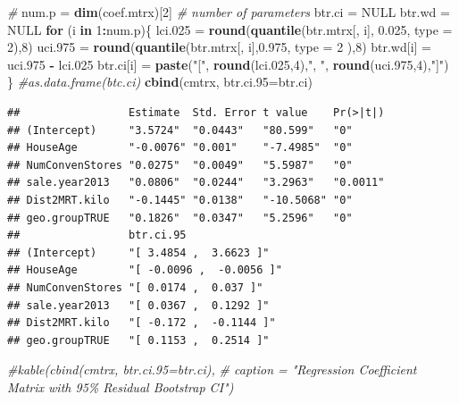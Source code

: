 \documentclass[
]{book}
\newenvironment{Shaded}{\begin{snugshade}}{\end{snugshade}}
\newcommand{\AttributeTok}[1]{\textcolor[rgb]{0.13,0.29,0.53}{#1}}
\newcommand{\CommentTok}[1]{\textcolor[rgb]{0.56,0.35,0.01}{\textit{#1}}}
\newcommand{\ConstantTok}[1]{\textcolor[rgb]{0.56,0.35,0.01}{#1}}
\newcommand{\ControlFlowTok}[1]{\textcolor[rgb]{0.13,0.29,0.53}{\textbf{#1}}}
\newcommand{\DecValTok}[1]{\textcolor[rgb]{0.00,0.00,0.81}{#1}}
\newcommand{\FloatTok}[1]{\textcolor[rgb]{0.00,0.00,0.81}{#1}}
\newcommand{\FunctionTok}[1]{\textcolor[rgb]{0.13,0.29,0.53}{\textbf{#1}}}
\newcommand{\NormalTok}[1]{#1}
\newcommand{\OtherTok}[1]{\textcolor[rgb]{0.56,0.35,0.01}{#1}}
\newcommand{\SpecialCharTok}[1]{\textcolor[rgb]{0.81,0.36,0.00}{\textbf{#1}}}
\newcommand{\StringTok}[1]{\textcolor[rgb]{0.31,0.60,0.02}{#1}}
\begin{document}
\begin{Shaded}
\begin{Highlighting}[]
\CommentTok{\#}
\NormalTok{num.p }\OtherTok{=} \FunctionTok{dim}\NormalTok{(coef.mtrx)[}\DecValTok{2}\NormalTok{]  }\CommentTok{\# number of parameters}
\NormalTok{btr.ci }\OtherTok{=} \ConstantTok{NULL}
\NormalTok{btr.wd }\OtherTok{=} \ConstantTok{NULL}
\ControlFlowTok{for}\NormalTok{ (i }\ControlFlowTok{in} \DecValTok{1}\SpecialCharTok{:}\NormalTok{num.p)\{}
\NormalTok{  lci}\FloatTok{.025} \OtherTok{=} \FunctionTok{round}\NormalTok{(}\FunctionTok{quantile}\NormalTok{(btr.mtrx[, i], }\FloatTok{0.025}\NormalTok{, }\AttributeTok{type =} \DecValTok{2}\NormalTok{),}\DecValTok{8}\NormalTok{)}
\NormalTok{  uci}\FloatTok{.975} \OtherTok{=} \FunctionTok{round}\NormalTok{(}\FunctionTok{quantile}\NormalTok{(btr.mtrx[, i],}\FloatTok{0.975}\NormalTok{, }\AttributeTok{type =} \DecValTok{2}\NormalTok{ ),}\DecValTok{8}\NormalTok{)}
\NormalTok{  btr.wd[i] }\OtherTok{=}\NormalTok{ uci}\FloatTok{.975} \SpecialCharTok{{-}}\NormalTok{ lci}\FloatTok{.025}
\NormalTok{  btr.ci[i] }\OtherTok{=} \FunctionTok{paste}\NormalTok{(}\StringTok{"["}\NormalTok{, }\FunctionTok{round}\NormalTok{(lci}\FloatTok{.025}\NormalTok{,}\DecValTok{4}\NormalTok{),}\StringTok{", "}\NormalTok{, }\FunctionTok{round}\NormalTok{(uci}\FloatTok{.975}\NormalTok{,}\DecValTok{4}\NormalTok{),}\StringTok{"]"}\NormalTok{)}
\NormalTok{\}}
\CommentTok{\#as.data.frame(btc.ci)}
\FunctionTok{cbind}\NormalTok{(cmtrx, }\AttributeTok{btr.ci.95=}\NormalTok{btr.ci)}
\end{Highlighting}
\end{Shaded}

\begin{verbatim}
##                 Estimate  Std. Error t value    Pr(>|t|)
## (Intercept)     "3.5724"  "0.0443"   "80.599"   "0"     
## HouseAge        "-0.0076" "0.001"    "-7.4985"  "0"     
## NumConvenStores "0.0275"  "0.0049"   "5.5987"   "0"     
## sale.year2013   "0.0806"  "0.0244"   "3.2963"   "0.0011"
## Dist2MRT.kilo   "-0.1445" "0.0138"   "-10.5068" "0"     
## geo.groupTRUE   "0.1826"  "0.0347"   "5.2596"   "0"     
##                 btr.ci.95               
## (Intercept)     "[ 3.4854 ,  3.6623 ]"  
## HouseAge        "[ -0.0096 ,  -0.0056 ]"
## NumConvenStores "[ 0.0174 ,  0.037 ]"   
## sale.year2013   "[ 0.0367 ,  0.1292 ]"  
## Dist2MRT.kilo   "[ -0.172 ,  -0.1144 ]" 
## geo.groupTRUE   "[ 0.1153 ,  0.2514 ]"
\end{verbatim}

\begin{Shaded}
\begin{Highlighting}[]
\CommentTok{\#kable(cbind(cmtrx, btr.ci.95=btr.ci), }
\CommentTok{\#      caption = "Regression Coefficient Matrix with 95\% Residual Bootstrap CI")}
\end{Highlighting}
\end{Shaded}
\end{document}
